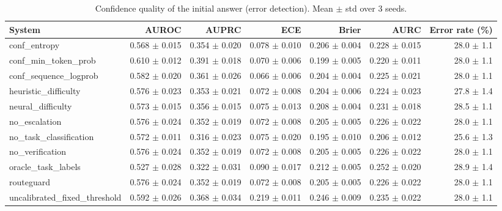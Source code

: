 \begin{table}[t]
\centering
\small
\caption{Confidence quality of the initial answer (error detection). Mean $\pm$ std over 3 seeds.}
\label{tab:calibration}
\begin{tabular}{lrrrrrr}
\toprule
System & AUROC & AUPRC & ECE & Brier & AURC & Error rate (\%) \\
\midrule
conf\_entropy & 0.568 $\pm$ 0.015 & 0.354 $\pm$ 0.020 & 0.078 $\pm$ 0.010 & 0.206 $\pm$ 0.004 & 0.228 $\pm$ 0.015 & 28.0 $\pm$ 1.1 \\
conf\_min\_token\_prob & 0.610 $\pm$ 0.012 & 0.391 $\pm$ 0.018 & 0.070 $\pm$ 0.006 & 0.199 $\pm$ 0.005 & 0.220 $\pm$ 0.011 & 28.0 $\pm$ 1.1 \\
conf\_sequence\_logprob & 0.582 $\pm$ 0.020 & 0.361 $\pm$ 0.026 & 0.066 $\pm$ 0.006 & 0.204 $\pm$ 0.004 & 0.225 $\pm$ 0.021 & 28.0 $\pm$ 1.1 \\
heuristic\_difficulty & 0.576 $\pm$ 0.023 & 0.353 $\pm$ 0.021 & 0.072 $\pm$ 0.008 & 0.204 $\pm$ 0.006 & 0.224 $\pm$ 0.023 & 27.8 $\pm$ 1.4 \\
neural\_difficulty & 0.573 $\pm$ 0.015 & 0.356 $\pm$ 0.015 & 0.075 $\pm$ 0.013 & 0.208 $\pm$ 0.004 & 0.231 $\pm$ 0.018 & 28.5 $\pm$ 1.1 \\
no\_escalation & 0.576 $\pm$ 0.024 & 0.352 $\pm$ 0.019 & 0.072 $\pm$ 0.008 & 0.205 $\pm$ 0.005 & 0.226 $\pm$ 0.022 & 28.0 $\pm$ 1.1 \\
no\_task\_classification & 0.572 $\pm$ 0.011 & 0.316 $\pm$ 0.023 & 0.075 $\pm$ 0.020 & 0.195 $\pm$ 0.010 & 0.206 $\pm$ 0.012 & 25.6 $\pm$ 1.3 \\
no\_verification & 0.576 $\pm$ 0.024 & 0.352 $\pm$ 0.019 & 0.072 $\pm$ 0.008 & 0.205 $\pm$ 0.005 & 0.226 $\pm$ 0.022 & 28.0 $\pm$ 1.1 \\
oracle\_task\_labels & 0.527 $\pm$ 0.028 & 0.322 $\pm$ 0.031 & 0.090 $\pm$ 0.017 & 0.212 $\pm$ 0.005 & 0.252 $\pm$ 0.020 & 28.9 $\pm$ 1.4 \\
routeguard & 0.576 $\pm$ 0.024 & 0.352 $\pm$ 0.019 & 0.072 $\pm$ 0.008 & 0.205 $\pm$ 0.005 & 0.226 $\pm$ 0.022 & 28.0 $\pm$ 1.1 \\
uncalibrated\_fixed\_threshold & 0.592 $\pm$ 0.026 & 0.368 $\pm$ 0.034 & 0.219 $\pm$ 0.011 & 0.246 $\pm$ 0.009 & 0.235 $\pm$ 0.022 & 28.0 $\pm$ 1.1 \\
\bottomrule
\end{tabular}
\end{table}
